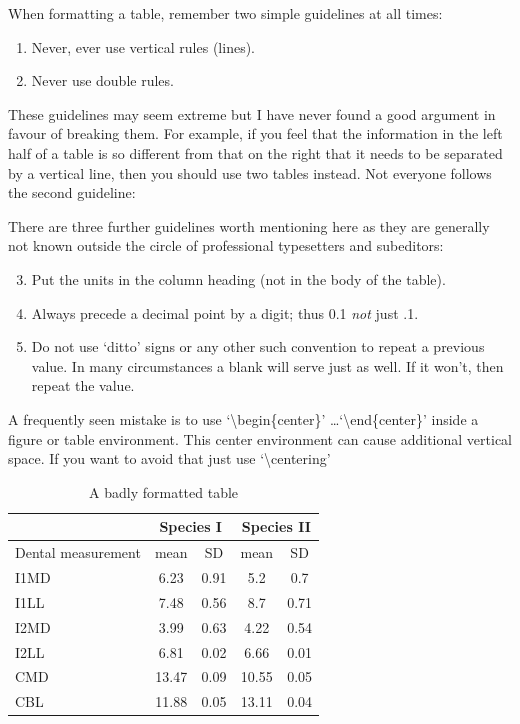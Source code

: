 \documentclass[a4paper,12pt,times,print,index, custombib]{PhDThesisPSnPDF}\usepackage[]{graphicx}\usepackage[]{color}
\begin{document}
When formatting a table, remember two simple guidelines at all times:

\begin{enumerate}
  \item Never, ever use vertical rules (lines).
  \item Never use double rules.
\end{enumerate}

These guidelines may seem extreme but I have
never found a good argument in favour of breaking them. For
example, if you feel that the information in the left half of
a table is so different from that on the right that it needs
to be separated by a vertical line, then you should use two
tables instead. Not everyone follows the second guideline:

There are three further guidelines worth mentioning here as they
are generally not known outside the circle of professional
typesetters and subeditors:

\begin{enumerate}\setcounter{enumi}{2}
  \item Put the units in the column heading (not in the body of
          the table).
  \item Always precede a decimal point by a digit; thus 0.1
      {\em not} just .1.
  \item Do not use `ditto' signs or any other such convention to
      repeat a previous value. In many circumstances a blank
      will serve just as well. If it won't, then repeat the value.
\end{enumerate}

A frequently seen mistake is to use `\textbackslash begin\{center\}' \dots `\textbackslash end\{center\}' inside a figure or table environment. This center environment can cause additional vertical space. If you want to avoid that just use `\textbackslash centering'


\begin{table}
\caption{A badly formatted table}
\centering
\label{table:bad_table}
\begin{tabular}{|l|c|c|c|c|}
\hline 
& \multicolumn{2}{c}{Species I} & \multicolumn{2}{c|}{Species II} \\ 
\hline
Dental measurement  & mean & SD  & mean & SD  \\ \hline 
\hline
I1MD & 6.23 & 0.91 & 5.2  & 0.7  \\
\hline 
I1LL & 7.48 & 0.56 & 8.7  & 0.71 \\
\hline 
I2MD & 3.99 & 0.63 & 4.22 & 0.54 \\
\hline 
I2LL & 6.81 & 0.02 & 6.66 & 0.01 \\
\hline 
CMD & 13.47 & 0.09 & 10.55 & 0.05 \\
\hline 
CBL & 11.88 & 0.05 & 13.11 & 0.04\\ 
\hline 
\end{tabular}
\end{table}
\end{document}
